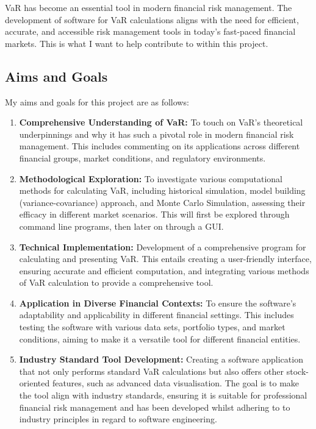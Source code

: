 \documentclass{article}
\begin{document}
VaR has become an essential tool in modern financial risk management. The development of software for VaR calculations aligns with the need for efficient, accurate, and accessible risk management tools in today's fast-paced financial markets. This is what I want to help contribute to within this project.\\

\subsection{Aims and Goals}
My aims and goals for this project are as follows:

\begin{enumerate}
    \item \textbf{Comprehensive Understanding of VaR:} To touch on VaR's theoretical underpinnings and why it has such a pivotal role in modern financial risk management. This includes commenting on its applications across different financial groups, market conditions, and regulatory environments.
    
    \item \textbf{Methodological Exploration:} To investigate various computational methods for calculating VaR, including historical simulation, model building (variance-covariance) approach, and Monte Carlo Simulation, assessing their efficacy in different market scenarios. This will first be explored through command line programs, then later on through a GUI\@.
    
    \item \textbf{Technical Implementation:} Development of a comprehensive program for calculating and presenting VaR. This entails creating a user-friendly interface, ensuring accurate and efficient computation, and integrating various methods of VaR calculation to provide a comprehensive tool.
    
    \item \textbf{Application in Diverse Financial Contexts:} To ensure the software's adaptability and applicability in different financial settings. This includes testing the software with various data sets, portfolio types, and market conditions, aiming to make it a versatile tool for different financial entities.
    
    \item \textbf{Industry Standard Tool Development:} Creating a software application that not only performs standard VaR calculations but also offers other stock-oriented features, such as advanced data visualisation. The goal is to make the tool align with industry standards, ensuring it is suitable for professional financial risk management and has been developed whilst adhering to to industry principles in regard to software engineering.
\end{enumerate}
\end{document}
